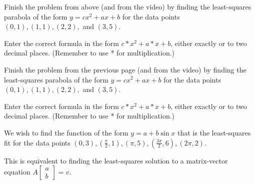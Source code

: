 \endedxproblem





Finish the problem from above (and from the video) by finding the least-squares parabola of the form
$y = cx^2 + ax + b$ for the
data points $(0,1), (1,1), (2,2),$ and $(3,5)$.  


Enter the correct formula in the form $c*x^2 + a*x + b$, either exactly or to two decimal places.  (Remember to use * for multiplication.)    


\edXsolution{
}

\endedxproblem




\endedxvertical








Finish the problem from the previous page (and from the video) by finding the least-squares parabola of the form
$y = cx^2 + ax + b$ for the
data points $(0,1), (1,1), (2,2),$ and $(3,5)$.  


Enter the correct formula in the form $c*x^2 + a*x + b$, either exactly or to two decimal places.  (Remember to use * for multiplication.)    


\edXsolution{
}

\endedxproblem




We wish to find the function of the form $y = a + b\sin x$ that is the least-squares fit for the  data points $(0,3), (\frac{\pi}{2},1), (\pi, 5), (\frac{3\pi}{2},6),(2\pi, 2).$

This is equivalent to finding the least-squares solution to a matrix-vector equation
$
A\left[ \begin{array}{c} a \\ b\end{array} \right] = v.$

